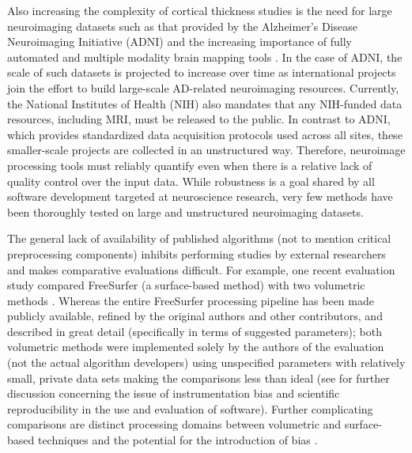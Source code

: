 Also increasing the complexity of cortical thickness studies is
the need for large neuroimaging datasets such as that provided by the Alzheimer's
Disease Neuroimaging Initiative (ADNI) and the increasing importance
of fully automated and multiple modality brain mapping tools
\citep{Weiner2012}.  In the case of ADNI, the scale of such datasets is projected
to increase over time as international projects join the effort to build
large-scale AD-related neuroimaging resources.  Currently, the
National Institutes of Health (NIH) also mandates that any NIH-funded data
resources, including MRI, must be released to the public.  In contrast
to ADNI, which provides standardized data acquisition protocols used
across all sites, these smaller-scale projects are collected in an
unstructured way.  Therefore, neuroimage processing tools must
reliably quantify even when there is a relative lack of quality
control over the input data.  While robustness is a goal shared by all
software development targeted at neuroscience research, very few methods have
been thoroughly tested on large and unstructured neuroimaging datasets.


The general lack of availability of published
algorithms \citep{kovacevic2006} (not to mention critical preprocessing
components) inhibits performing studies by external researchers 
and makes comparative evaluations difficult.  For example, one recent evaluation 
study \citep{clarkson2011} compared
FreeSurfer (a surface-based method) with two volumetric methods \citep{jones2000,das2009}.
Whereas the entire FreeSurfer processing pipeline has been made publicly available, 
refined by the original authors and other contributors, and described in great detail 
(specifically in terms of suggested parameters); both volumetric methods were 
implemented solely by the authors of the evaluation (not the actual algorithm developers) 
using unspecified parameters with relatively small, private data sets
making the comparisons less than ideal (see \cite{tustison2013} for further discussion 
concerning the issue of instrumentation bias and scientific reproducibility in the use and evaluation of software). Further complicating comparisons are distinct 
processing domains between volumetric and surface-based techniques and the potential for the introduction of bias \citep{klein2010}.

